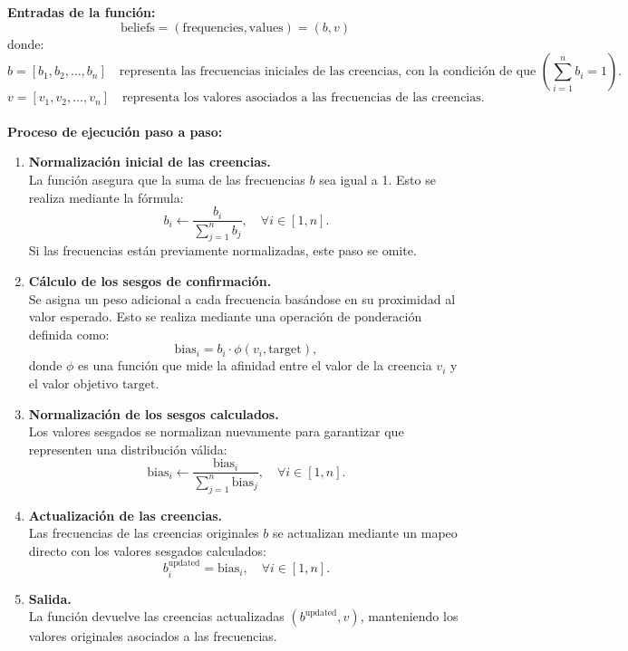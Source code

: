 \documentclass{article}
\begin{document}
	\textbf{Entradas de la función:}
	\[
	\text{beliefs} = (\text{frequencies}, \text{values}) = (b, v)
	\]
	donde:
	\[
	b = [b_1, b_2, \dots, b_n] \quad \text{representa las frecuencias iniciales de las creencias, con la condición de que } \left(\sum_{i=1}^n b_i = 1\right).
	\]
	\[
	v = [v_1, v_2, \dots, v_n] \quad \text{representa los valores asociados a las frecuencias de las creencias.}
	\]
	\\
	\textbf{Proceso de ejecución paso a paso:}\\
	\begin{enumerate}
	    \item \textbf{Normalización inicial de las creencias.}\\
	    La función asegura que la suma de las frecuencias $b$ sea igual a 1. Esto se realiza mediante la fórmula:
	    \[
	    b_i \leftarrow \frac{b_i}{\sum_{j=1}^n b_j}, \quad \forall i \in [1, n].
	    \]
	    Si las frecuencias están previamente normalizadas, este paso se omite.
	
	    \item \textbf{Cálculo de los sesgos de confirmación.}\\
	    Se asigna un peso adicional a cada frecuencia basándose en su proximidad al valor esperado. Esto se realiza mediante una operación de ponderación definida como:
	    \[
	    \text{bias}_i = b_i \cdot \phi(v_i, \text{target}),
	    \]
	    donde $\phi$ es una función que mide la afinidad entre el valor de la creencia $v_i$ y el valor objetivo $\text{target}$. 
	
	    \item \textbf{Normalización de los sesgos calculados.}\\
	    Los valores sesgados se normalizan nuevamente para garantizar que representen una distribución válida:
	    \[
	    \text{bias}_i \leftarrow \frac{\text{bias}_i}{\sum_{j=1}^n \text{bias}_j}, \quad \forall i \in [1, n].
	    \]
	
	    \item \textbf{Actualización de las creencias.}\\
	    Las frecuencias de las creencias originales $b$ se actualizan mediante un mapeo directo con los valores sesgados calculados:
	    \[
	    b_i^{\text{updated}} = \text{bias}_i, \quad \forall i \in [1, n].
	    \]
	
	    \item \textbf{Salida.}\\
	    La función devuelve las creencias actualizadas $(b^{\text{updated}}, v)$, manteniendo los valores originales asociados a las frecuencias.
	\end{enumerate}
	
\end{document}
